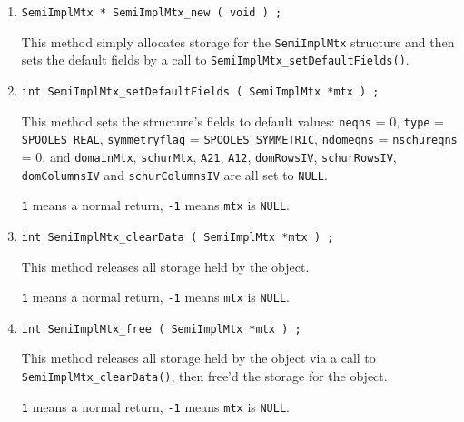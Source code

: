 \begin{enumerate}
\item
\begin{verbatim}
SemiImplMtx * SemiImplMtx_new ( void ) ;
\end{verbatim}
This method simply allocates storage for the {\tt SemiImplMtx} 
structure and then sets the default fields by a call to 
{\tt SemiImplMtx\_setDefaultFields()}.
\item
\begin{verbatim}
int SemiImplMtx_setDefaultFields ( SemiImplMtx *mtx ) ;
\end{verbatim}
This method sets the structure's fields to default values:
{\tt neqns} = 0,
{\tt type} = {\tt SPOOLES\_REAL}, 
{\tt symmetryflag} = {\tt SPOOLES\_SYMMETRIC}, 
{\tt ndomeqns} = {\tt nschureqns} = 0,
and {\tt domainMtx}, {\tt schurMtx}, {\tt A21}, {\tt A12},
{\tt domRowsIV}, {\tt schurRowsIV},
{\tt domColumnsIV}  and {\tt schurColumnsIV} 
are all set to {\tt NULL}.
\par {}
{\tt 1} means a normal return,
{\tt -1} means {\tt mtx} is {\tt NULL}.
\item
\begin{verbatim}
int SemiImplMtx_clearData ( SemiImplMtx *mtx ) ;
\end{verbatim}
This method releases all storage held by the object.
\par {}
{\tt 1} means a normal return,
{\tt -1} means {\tt mtx} is {\tt NULL}.
\item
\begin{verbatim}
int SemiImplMtx_free ( SemiImplMtx *mtx ) ;
\end{verbatim}
This method releases all storage held by the object via a call to
{\tt SemiImplMtx\_clearData()}, then free'd the storage for the
object.
\par {}
{\tt 1} means a normal return,
{\tt -1} means {\tt mtx} is {\tt NULL}.
\end{enumerate}
\par

